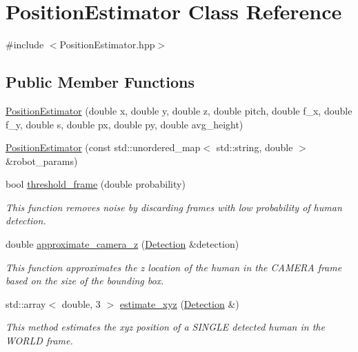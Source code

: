 \hypertarget{class_position_estimator}{}\section{Position\+Estimator Class Reference}
\label{class_position_estimator}


{\ttfamily \#include $<$Position\+Estimator.\+hpp$>$}

\subsection*{Public Member Functions}
\begin{DoxyCompactItemize}
\item 
\hyperlink{class_position_estimator_a39de44247f8c8feaed5bd1de8438245f}{Position\+Estimator} (double x, double y, double z, double pitch, double f\+\_\+x, double f\+\_\+y, double s, double px, double py, double avg\+\_\+height)
\item 
\hyperlink{class_position_estimator_af0b8305de010b7f15f0b18499d8d50c3}{Position\+Estimator} (const std\+::unordered\+\_\+map$<$ std\+::string, double $>$ \&robot\+\_\+params)
\item 
bool \hyperlink{class_position_estimator_a6414758ee472d223f6b97369abe27968}{threshold\+\_\+frame} (double probability)
\begin{DoxyCompactList}\small\item\em This function removes noise by discarding frames with low probability of human detection. \end{DoxyCompactList}\item 
double \hyperlink{class_position_estimator_aaa7e82a010bfb5dbcc795af9718c9eb0}{approximate\+\_\+camera\+\_\+z} (\hyperlink{struct_detection}{Detection} \&detection)
\begin{DoxyCompactList}\small\item\em This function approximates the z location of the human in the C\+A\+M\+E\+RA frame based on the size of the bounding box. \end{DoxyCompactList}\item 
std\+::array$<$ double, 3 $>$ \hyperlink{class_position_estimator_a90f4ced196e47ac347fcf53e834fbcab}{estimate\+\_\+xyz} (\hyperlink{struct_detection}{Detection} \&)
\begin{DoxyCompactList}\small\item\em This method estimates the xyz position of a S\+I\+N\+G\+LE detected human in the W\+O\+R\+LD frame. \end{DoxyCompactList}\item 

\end{DoxyCompactItemize}
